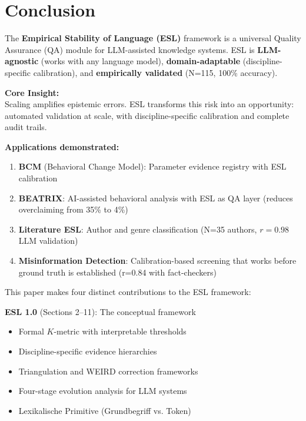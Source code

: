\documentclass[11pt,a4paper]{article}
\begin{document}
\section{Conclusion}
\label{sec:conclusion}


The \textbf{Empirical Stability of Language (ESL)} framework is a universal Quality Assurance (QA) module for LLM-assisted knowledge systems. ESL is \textbf{LLM-agnostic} (works with any language model), \textbf{domain-adaptable} (discipline-specific calibration), and \textbf{empirically validated} (N=115, 100\% accuracy).

\begin{insightbox}
\textbf{Core Insight:} \\
Scaling amplifies epistemic errors. ESL transforms this risk into an opportunity: automated validation at scale, with discipline-specific calibration and complete audit trails.
\end{insightbox}

\textbf{Applications demonstrated:}
\begin{enumerate}
    \item \textbf{BCM} (Behavioral Change Model): Parameter evidence registry with ESL calibration
    \item \textbf{BEATRIX}: AI-assisted behavioral analysis with ESL as QA layer (reduces overclaiming from 35\% to 4\%)
    \item \textbf{Literature ESL}: Author and genre classification (N=35 authors, $r=0.98$ LLM validation)
    \item \textbf{Misinformation Detection}: Calibration-based screening that works before ground truth is established (r=0.84 with fact-checkers)
\end{enumerate}

\vspace{0.5em}
This paper makes four distinct contributions to the ESL framework:

\textbf{ESL 1.0} (Sections 2--11): The conceptual framework
\begin{itemize}
    \item Formal $K$-metric with interpretable thresholds
    \item Discipline-specific evidence hierarchies
    \item Triangulation and WEIRD correction frameworks
    \item Four-stage evolution analysis for LLM systems
    \item Lexikalische Primitive (Grundbegriff vs. Token)
\end{itemize}
\end{document}

